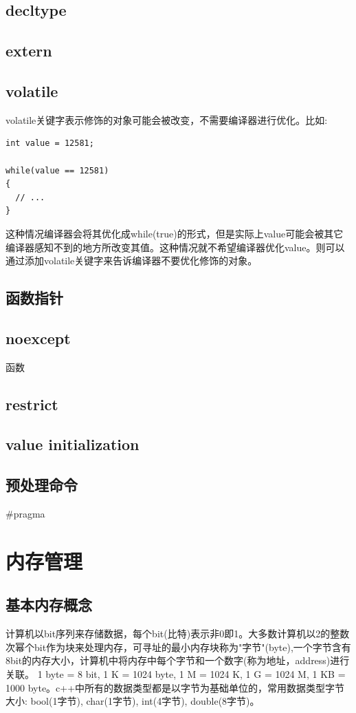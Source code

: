 \documentclass[12pt]{book}
\begin{document}
\subsection{decltype}
\subsection{extern}
\subsection{volatile}
volatile关键字表示修饰的对象可能会被改变，不需要编译器进行优化。比如:
\begin{lstlisting}
int value = 12581;

while(value == 12581)
{
  // ...
}
\end{lstlisting}
这种情况编译器会将其优化成while(true)的形式，但是实际上value可能会被其它编译器感知不到的地方所改变其值。这种情况就不希望编译器优化value。则可以通过添加volatile关键字来告诉编译器不要优化修饰的对象。

\subsection{函数指针}
\subsection{noexcept}
函数
\subsection{restrict}
\subsection{value initialization}
\subsection{预处理命令}
\#pragma

\section{内存管理}
\subsection{基本内存概念}
计算机以bit序列来存储数据，每个bit(比特)表示非0即1。大多数计算机以2的整数次幂个bit作为块来处理内存，可寻址的最小内存块称为"字节"(byte),一个字节含有8bit的内存大小，计算机中将内存中每个字节和一个数字(称为地址，address)进行关联。
1 byte = 8 bit, 1 K = 1024 byte, 1 M = 1024 K, 1 G = 1024 M, 1 KB = 1000 byte。c++中所有的数据类型都是以字节为基础单位的，常用数据类型字节大小: bool(1字节), char(1字节), int(4字节), double(8字节)。
\end{document}
